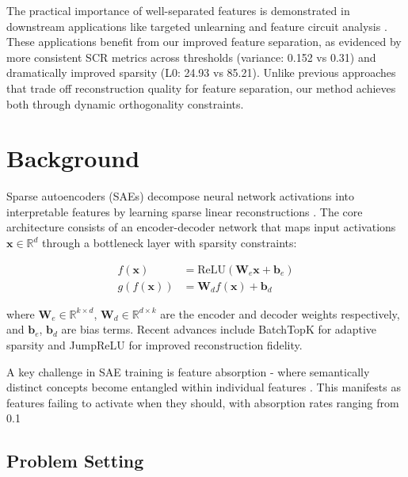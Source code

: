 \documentclass{article} %
\begin{document}
The practical importance of well-separated features is demonstrated in downstream applications like targeted unlearning \cite{farrellApplyingSparseAutoencoders2024} and feature circuit analysis \cite{marksSparseFeatureCircuits2024}. These applications benefit from our improved feature separation, as evidenced by more consistent SCR metrics across thresholds (variance: 0.152 vs 0.31) and dramatically improved sparsity (L0: 24.93 vs 85.21). Unlike previous approaches that trade off reconstruction quality for feature separation, our method achieves both through dynamic orthogonality constraints.

\section{Background}
\label{sec:background}

Sparse autoencoders (SAEs) decompose neural network activations into interpretable features by learning sparse linear reconstructions \cite{gaoScalingEvaluatingSparse}. The core architecture consists of an encoder-decoder network that maps input activations $\mathbf{x} \in \mathbb{R}^d$ through a bottleneck layer with sparsity constraints:

\begin{align*}
f(\mathbf{x}) &= \text{ReLU}(\mathbf{W}_e\mathbf{x} + \mathbf{b}_e) \\
g(f(\mathbf{x})) &= \mathbf{W}_df(\mathbf{x}) + \mathbf{b}_d
\end{align*}

where $\mathbf{W}_e \in \mathbb{R}^{k \times d}$, $\mathbf{W}_d \in \mathbb{R}^{d \times k}$ are the encoder and decoder weights respectively, and $\mathbf{b}_e$, $\mathbf{b}_d$ are bias terms. Recent advances include BatchTopK \cite{bussmannBatchTopKSparseAutoencoders2024} for adaptive sparsity and JumpReLU \cite{rajamanoharanJumpingAheadImproving2024} for improved reconstruction fidelity.

A key challenge in SAE training is feature absorption - where semantically distinct concepts become entangled within individual features \cite{chaninAbsorptionStudyingFeature2024}. This manifests as features failing to activate when they should, with absorption rates ranging from 0.1%

\subsection{Problem Setting}
\label{subsec:problem}
\end{document}
